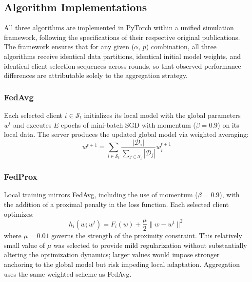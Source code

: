\documentclass[conference]{IEEEtran}
\begin{document}
\subsection{Algorithm Implementations}

All three algorithms are implemented in PyTorch within a unified simulation framework, following the specifications of their respective original publications. The framework ensures that for any given ($\alpha$, $p$) combination, all three algorithms receive identical data partitions, identical initial model weights, and identical client selection sequences across rounds, so that observed performance differences are attributable solely to the aggregation strategy.

\subsubsection{FedAvg} Each selected client $i \in \mathcal{S}_t$ initializes its local model with the global parameters $w^t$ and executes $E$ epochs of mini-batch SGD with momentum ($\beta = 0.9$) on its local data. The server produces the updated global model via weighted averaging:
\begin{equation}
    w^{t+1} = \sum_{i \in \mathcal{S}_t} \frac{|\mathcal{D}_i|}{\sum_{j \in \mathcal{S}_t} |\mathcal{D}_j|} w_i^{t+1}
\end{equation}

\subsubsection{FedProx} Local training mirrors FedAvg, including the use of momentum ($\beta = 0.9$), with the addition of a proximal penalty in the loss function. Each selected client optimizes:
\begin{equation}
    h_i(w; w^t) = F_i(w) + \frac{\mu}{2}\|w - w^t\|^2
\end{equation}
where $\mu = 0.01$ governs the strength of the proximity constraint. This relatively small value of $\mu$ was selected to provide mild regularization without substantially altering the optimization dynamics; larger values would impose stronger anchoring to the global model but risk impeding local adaptation. Aggregation uses the same weighted scheme as FedAvg.
\end{document}
